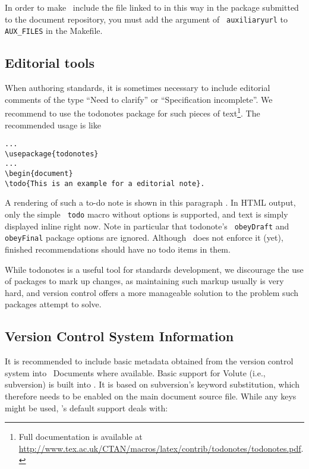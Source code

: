\documentclass[11pt,a4paper]{ivoa}
\newcommand{\texword}[1]{\texttt{\color{texcolor} #1}}
\begin{document}
In order to make \ivoatex~include the file linked to in this way in the
package submitted to the document repository, you must add the argument
of \texword{auxiliaryurl} to \verb|AUX_FILES| in the Makefile.

\subsection{Editorial tools}

When authoring standards, it is sometimes necessary to include
editorial comments of the type ``Need to clarify'' or ``Specification
incomplete''.  We recommend to use the todonotes package for such
pieces of text\footnote{Full documentation is available at
\url{http://www.tex.ac.uk/CTAN/macros/latex/contrib/todonotes/todonotes.pdf}.}.
The recommended usage is like
\begin{lstlisting}
...
\usepackage{todonotes}
...
\begin{document}
\todo{This is an example for a editorial note}.
\end{lstlisting}

A rendering of such a to-do note is shown in this paragraph
. In HTML output,
only the simple \texword{todo} macro without options is supported, and
text is simply displayed inline right now.  Note in particular that
todonote's \texword{obeyDraft} and \texword{obeyFinal} package options
are ignored.  Although \ivoatex\ does not enforce it (yet), finished
recommendations should have no todo items in them.

While todonotes is a useful tool for standards development, we
discourage the use of packages to mark up changes, as maintaining such
markup usually is very hard, and version control offers a more
manageable solution to the problem such packages attempt to solve.

\subsection{Version Control System Information}

It is recommended to include basic metadata obtained from the version
control system into \ivoatex~Documents where available.  Basic support
for Volute (i.e., subversion) is built into \ivoatex.  It is based on
subversion's
keyword substitution, which therefore needs to be enabled on the 
main document source file.
While any keys might be used, \ivoatex's default support deals with:
\end{document}
